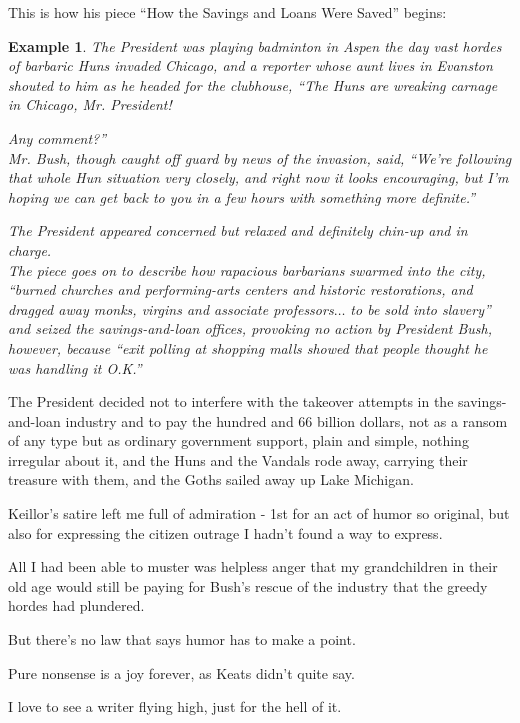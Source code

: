 \documentclass{book}
\numberwithin{equation}{section}
\newtheorem{example}{Example}[chapter]
\begin{document}
This is how his piece ``How the Savings and Loans Were Saved'' begins:
\begin{example}
    The President was playing badminton in Aspen the day vast hordes of barbaric Huns invaded Chicago, and a reporter whose aunt lives in Evanston shouted to him as he headed for the clubhouse, ``The Huns are wreaking carnage in Chicago, Mr. President!
    
    Any comment?''\\
    
    Mr. Bush, though caught off guard by news of the invasion, said, ``We're following that whole Hun situation very closely, and right now it looks encouraging, but I'm hoping we can get back to you in a few hours with something more definite.''
    
    The President appeared concerned but relaxed and definitely chin-up and in charge.
    \\
    
    The piece goes on to describe how rapacious barbarians swarmed into the city, ``burned churches and performing-arts centers and historic restorations, and dragged away monks, virgins and associate professors$\ldots$ to be sold into slavery'' and seized the savings-and-loan offices, provoking no action by President Bush, however, because ``exit polling at shopping malls showed that people thought he was handling it O.K.''
\end{example}
The President decided not to interfere with the takeover attempts in the savings-and-loan industry and to pay the hundred and 66 billion dollars, not as a ransom of any type but as ordinary government support, plain and simple, nothing irregular about it, and the Huns and the Vandals rode away, carrying their treasure with them, and the Goths sailed away up Lake Michigan.

%
Keillor's satire left me full of admiration - 1st for an act of humor so original, but also for expressing the citizen outrage I hadn't found a way to express.

All I had been able to muster was helpless anger that my grandchildren in their old age would still be paying for Bush's rescue of the industry that the greedy hordes had plundered.

%
But there's no law that says humor has to make a point.

Pure nonsense is a joy forever, as Keats didn't quite say.

I love to see a writer flying high, just for the hell of it.
\end{document}
